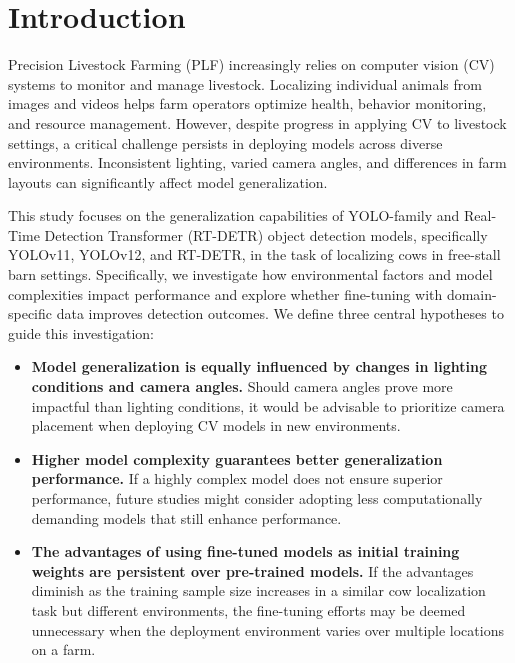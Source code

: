 \section{Introduction}

Precision Livestock Farming (PLF) increasingly relies on computer vision (CV) systems to monitor and manage livestock. Localizing individual animals from images and videos helps farm operators optimize health, behavior monitoring, and resource management. However, despite progress in applying CV to livestock settings, a critical challenge persists in deploying models across diverse environments. Inconsistent lighting, varied camera angles, and differences in farm layouts can significantly affect model generalization.

This study focuses on the generalization capabilities of YOLO-family and Real-Time Detection Transformer (RT-DETR) object detection models, specifically YOLOv11\cite{ultralytics2024yolo11, khanam2024yolov11}, YOLOv12\cite{ultralytics2024yolo12, tian2025yolov12}, and RT-DETR\cite{ultralytics2024detrt, carion2020end}, in the task of localizing cows in free-stall barn settings. Specifically, we investigate how environmental factors and model complexities impact performance and explore whether fine-tuning with domain-specific data improves detection outcomes. We define three central hypotheses to guide this investigation:

\begin{itemize}
    \item \textbf{Model generalization is equally influenced by changes in lighting conditions and camera angles.} Should camera angles prove more impactful than lighting conditions, it would be advisable to prioritize camera placement when deploying CV models in new environments.
    \item \textbf{Higher model complexity guarantees better generalization performance.} If a highly complex model does not ensure superior performance, future studies might consider adopting less computationally demanding models that still enhance performance.
    \item \textbf{The advantages of using fine-tuned models as initial training weights are persistent over pre-trained models.} If the advantages diminish as the training sample size increases in a similar cow localization task but different environments, the fine-tuning efforts may be deemed unnecessary when the deployment environment varies over multiple locations on a farm.
\end{itemize}

